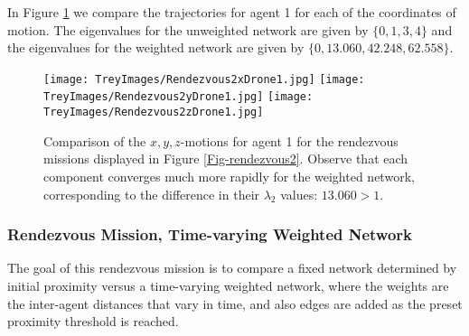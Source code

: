 \documentclass{aims}
\theoremstyle{definition}
\begin{document}
In Figure \ref{Fig-rendezvous2-xyz} we compare the trajectories for agent 1 for each of the coordinates of motion. The eigenvalues for the unweighted network are given by $\{0,1,3,4\}$ and the eigenvalues for the weighted network are given by $\{0,13.060,42.248,62.558\}$.

\begin{figure}[h!]
\texttt{[image: TreyImages/Rendezvous2xDrone1.jpg]}
\texttt{[image: TreyImages/Rendezvous2yDrone1.jpg]}
\texttt{[image: TreyImages/Rendezvous2zDrone1.jpg]}
\caption{Comparison of the $x,y,z$-motions for agent 1 for the rendezvous missions displayed in Figure \ref{Fig-rendezvous2}. Observe that each component converges much more rapidly for the weighted network, corresponding to the difference in their $\lambda_2$ values: $13.060>1$.}
\label{Fig-rendezvous2-xyz}
\end{figure}


\subsubsection{Rendezvous Mission, Time-varying Weighted Network}
The goal of this rendezvous mission is to compare a fixed network determined by initial proximity versus a time-varying weighted network, where the weights are the inter-agent distances that vary in time, and also edges are added as the preset proximity  threshold is reached. 
\end{document}
